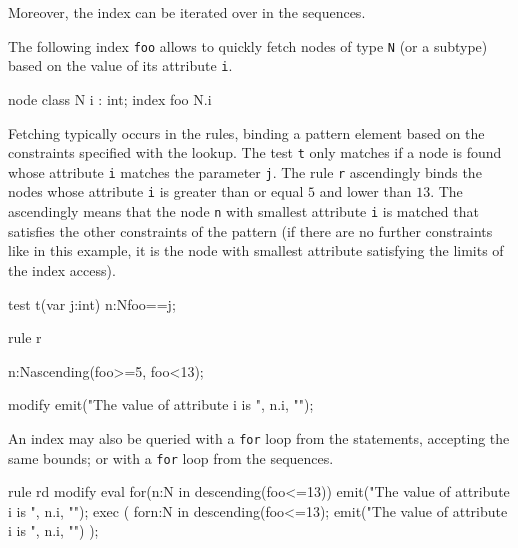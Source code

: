 Moreover, the index can be iterated over in the sequences.

\begin{example}
The following index \texttt{foo} allows to quickly fetch nodes of type \texttt{N} (or a subtype) based on the value of its attribute \texttt{i}.

\begin{grgen}
node class N {
  i : int;
}
index foo { N.i }
\end{grgen}

Fetching typically occurs in the rules, binding a pattern element based on the constraints specified with the lookup.
The test \texttt{t} only matches if a node is found whose attribute \texttt{i} matches the parameter \texttt{j}.
The rule \texttt{r} ascendingly binds the nodes whose attribute \texttt{i} is greater than or equal $5$ and lower than $13$.
The ascendingly means that the node \texttt{n} with smallest attribute \texttt{i} is matched that satisfies the other constraints of the pattern (if there are no further constraints like in this example, it is the node with smallest attribute satisfying the limits of the index access).

\begin{grgen}
test t(var j:int) {
  n:N{foo==j};	
}

rule r {
  n:N{ascending(foo>=5, foo<13)};

  modify {
    emit("The value of attribute i is ", n.i, "\n");
  }
}
\end{grgen}

An index may also be queried with a \texttt{for} loop from the statements, accepting the same bounds; 
or with a \texttt{for} loop from the sequences.

\begin{grgen}
rule rd {
  modify {
    eval {
      for(n:N in {descending(foo<=13)}) {
        emit("The value of attribute i is ", n.i, "\n");
      }
    }
    exec (
      for{n:N in {descending(foo<=13)}; {emit("The value of attribute i is ", n.i, "\n")} }
    );
  }
}
\end{grgen}

\end{example}

